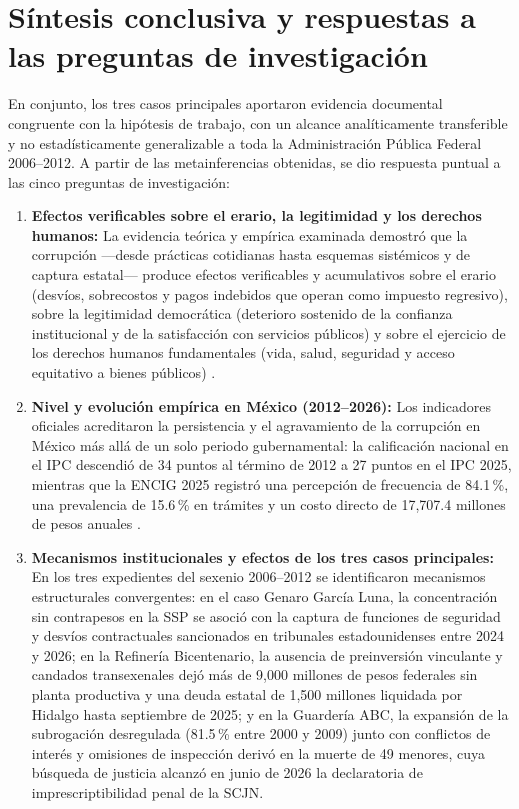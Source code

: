 \section{Síntesis conclusiva y respuestas a las preguntas de investigación}

En conjunto, los tres casos principales aportaron evidencia documental congruente con la hipótesis de trabajo, con un alcance analíticamente transferible y no estadísticamente generalizable a toda la Administración Pública Federal 2006--2012. A partir de las metainferencias obtenidas, se dio respuesta puntual a las cinco preguntas de investigación:

\begin{enumerate}
  \item \textbf{Efectos verificables sobre el erario, la legitimidad y los derechos humanos:} La evidencia teórica y empírica examinada demostró que la corrupción ---desde prácticas cotidianas hasta esquemas sistémicos y de captura estatal--- produce efectos verificables y acumulativos sobre el erario (desvíos, sobrecostos y pagos indebidos que operan como impuesto regresivo), sobre la legitimidad democrática (deterioro sostenido de la confianza institucional y de la satisfacción con servicios públicos) y sobre el ejercicio de los derechos humanos fundamentales (vida, salud, seguridad y acceso equitativo a bienes públicos) \citep{cidh2019,inegi2026,monsivais2020,rios2021,roseackerman1999}.
  
  \item \textbf{Nivel y evolución empírica en México (2012--2026):} Los indicadores oficiales acreditaron la persistencia y el agravamiento de la corrupción en México más allá de un solo periodo gubernamental: la calificación nacional en el IPC descendió de 34 puntos al término de 2012 a 27 puntos en el IPC 2025, mientras que la ENCIG 2025 registró una percepción de frecuencia de 84.1\,\%, una prevalencia de 15.6\,\% en trámites y un costo directo de 17,707.4 millones de pesos anuales \citep{inegi2026,transparencia2026}.
  
  \item \textbf{Mecanismos institucionales y efectos de los tres casos principales:} En los tres expedientes del sexenio 2006--2012 se identificaron mecanismos estructurales convergentes: en el caso Genaro García Luna, la concentración sin contrapesos en la SSP se asoció con la captura de funciones de seguridad y desvíos contractuales sancionados en tribunales estadounidenses entre 2024 y 2026; en la Refinería Bicentenario, la ausencia de preinversión vinculante y candados transexenales dejó más de 9,000 millones de pesos federales sin planta productiva y una deuda estatal de 1,500 millones liquidada por Hidalgo hasta septiembre de 2025; y en la Guardería ABC, la expansión de la subrogación desregulada (81.5\,\% entre 2000 y 2009) junto con conflictos de interés y omisiones de inspección derivó en la muerte de 49 menores, cuya búsqueda de justicia alcanzó en junio de 2026 la declaratoria de imprescriptibilidad penal de la SCJN.
  

\end{enumerate}
